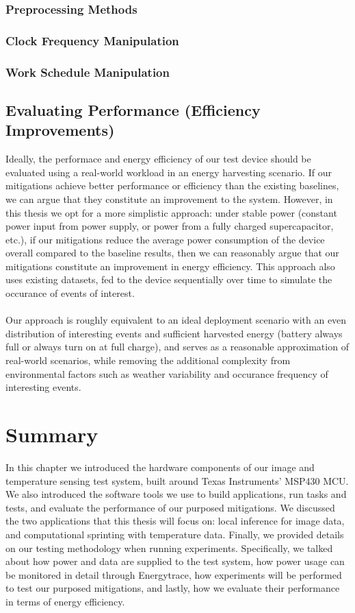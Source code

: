 \documentclass[twoside]{report}
\begin{document}
\subsubsection{Preprocessing Methods}

\subsubsection{Clock Frequency Manipulation}

\subsubsection{Work Schedule Manipulation}

\subsection{Evaluating Performance (Efficiency Improvements)}
Ideally, the performace and energy efficiency of our test device should be evaluated using a real-world workload
in an energy harvesting scenario. If our mitigations achieve better performance or efficiency than the existing 
baselines, we can argue that they constitute an improvement to the system. However, in this thesis we opt 
for a more simplistic approach: under stable power (constant power input from power supply, or power from a fully 
charged supercapacitor, etc.), if our mitigations reduce the average power consumption of the device overall 
compared to the baseline results, then we can reasonably argue that our mitigations constitute an improvement in 
energy efficiency. This approach also uses existing datasets, fed to the device sequentially over time to simulate the occurance of 
events of interest.\\\\
Our approach is roughly equivalent to an ideal deployment scenario with an even distribution of interesting events and sufficient 
harvested energy (battery always full or always turn on at full charge), and serves as a reasonable approximation of real-world scenarios, while removing the additional 
complexity from environmental factors such as weather variability and occurance frequency of interesting events.

\section{Summary}
In this chapter we introduced the hardware components of our image and temperature sensing test system, built around Texas Instruments' MSP430 MCU.
We also introduced the software tools we use to build applications, run tasks and tests, and evaluate the performance of our purposed mitigations. 
We discussed the two applications that this thesis will focus on: local inference for image data, and computational sprinting with 
temperature data.
Finally, we provided details on our testing methodology when running experiments. Specifically, we talked about 
how power and data are supplied to the test system, how power usage can be monitored in detail through Energytrace, 
how experiments will be performed to test our purposed mitigations, and lastly, how we evaluate their performance 
in terms of energy efficiency.
\end{document}
